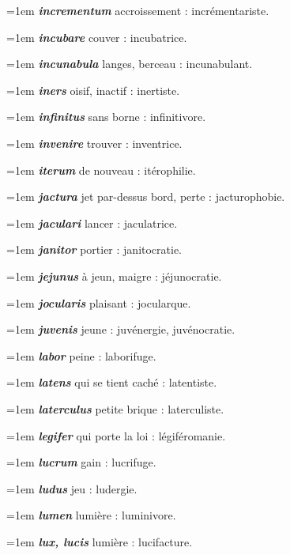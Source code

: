 \hangindent=1em \textbf{\textit{incrementum}} accroissement : incrémentariste.\par
\hangindent=1em \textbf{\textit{incubare}} couver : incubatrice.\par
\hangindent=1em \textbf{\textit{incunabula}} langes, berceau : incunabulant.\par
\hangindent=1em \textbf{\textit{iners}} oisif, inactif : inertiste.\par
\hangindent=1em \textbf{\textit{infinitus}} sans borne : infinitivore.\par
\hangindent=1em \textbf{\textit{invenire}} trouver : inventrice.\par
\hangindent=1em \textbf{\textit{iterum}} de nouveau : itérophilie.\par
\hangindent=1em \textbf{\textit{jactura}} jet par-dessus bord, perte : jacturophobie.\par
\hangindent=1em \textbf{\textit{jaculari}} lancer : jaculatrice.\par
\hangindent=1em \textbf{\textit{janitor}} portier : janitocratie.\par
\hangindent=1em \textbf{\textit{jejunus}} à jeun, maigre : jéjunocratie.\par
\hangindent=1em \textbf{\textit{jocularis}} plaisant : jocularque.\par
\hangindent=1em \textbf{\textit{juvenis}} jeune : juvénergie, juvénocratie.\par
\hangindent=1em \textbf{\textit{labor}} peine : laborifuge.\par
\hangindent=1em \textbf{\textit{latens}} qui se tient caché : latentiste.\par
\hangindent=1em \textbf{\textit{laterculus}} petite brique : laterculiste.\par
\hangindent=1em \textbf{\textit{legifer}} qui porte la loi : légiféromanie.\par
\hangindent=1em \textbf{\textit{lucrum}} gain : lucrifuge.\par
\hangindent=1em \textbf{\textit{ludus}} jeu : ludergie.\par
\hangindent=1em \textbf{\textit{lumen}} lumière : luminivore.\par
\hangindent=1em \textbf{\textit{lux, lucis}} lumière : lucifacture.\par
